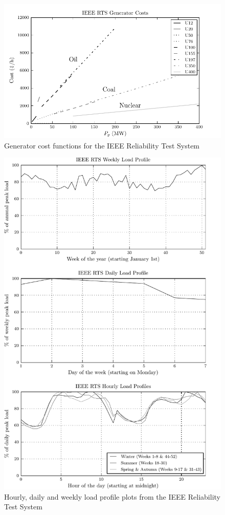 \begin{figure}
  \centering
  \includegraphics{figures/ieee_rts_gencosts}
  \caption{Generator cost functions for the IEEE Reliability Test System}
  \label{fig:ieee_rts_gencost_plot}
\end{figure}

\begin{figure}
  \centering
  \includegraphics{figures/ieee_rts_profiles}
  \caption{Hourly, daily and weekly load profile plots from the IEEE
  Reliability Test System}
  \label{fig:ieee_rts_profiles}
\end{figure}

